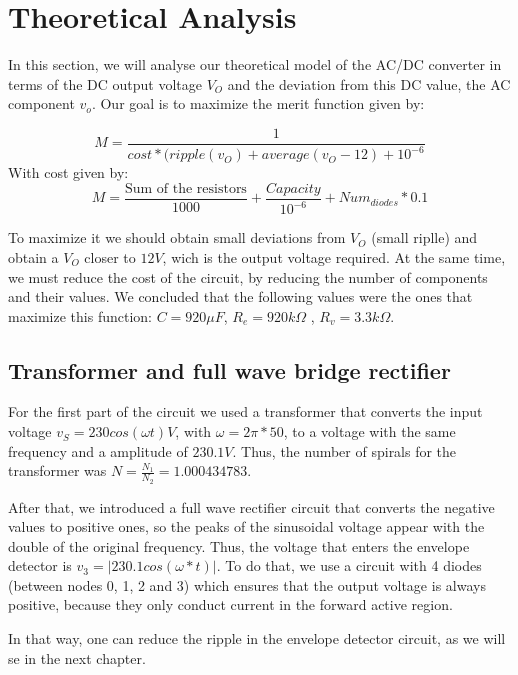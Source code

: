 \section{Theoretical Analysis}
\label{sec:analysis}

\par In this section, we will analyse our theoretical model of the AC/DC converter in terms of the DC output voltage $V_O$ and the deviation from this DC value, the AC component $v_o$. Our goal is to maximize the merit function given by:

\begin{equation}
M=\frac{1}{cost*(ripple(v_O)+average(v_O-12)+10^{-6}}
  \label{eq:merit}
\end{equation}
With cost given by:
\begin{equation}
M=\frac{\text{Sum of the resistors}}{1000}+\frac{Capacity}{10^{-6}}+Num_{diodes}*0.1
  \label{eq:cost}
\end{equation}
 
\par To maximize it we should obtain small deviations from $V_O$ (small riplle) and obtain a $V_O$ closer to $12V$, wich is the output voltage required. At the same time, we must reduce the cost of the circuit, by reducing the number of components and their values. We concluded that the following values were the ones that maximize this function: $C=920\mu F$, $R_e=920k\Omega$ , $R_v=3.3k\Omega$.
 
\subsection{Transformer and full wave bridge rectifier}
\label{subsec:full_wave_rectifier}

\par For the first part of the circuit we used a transformer that converts the input voltage $v_S=230cos(\omega t) V$, with $\omega=2\pi*50$, to a voltage with the same frequency and a amplitude of $230.1V$. Thus, the number of spirals for the transformer was $N=\frac{N_1}{N_2}=1.000434783$.

\par After that, we introduced a full wave rectifier circuit that converts the negative values to positive ones, so the peaks of the sinusoidal voltage appear with the double of the original frequency. Thus, the voltage that enters the envelope detector is $v_3=|230.1cos(\omega*t)|$. To do that, we use a circuit with 4 diodes (between nodes 0, 1, 2 and 3) which ensures that the output voltage is always positive, because they only conduct current in the forward active region.
\par In that way, one can reduce the ripple in the envelope detector circuit, as we will se in the next chapter.

